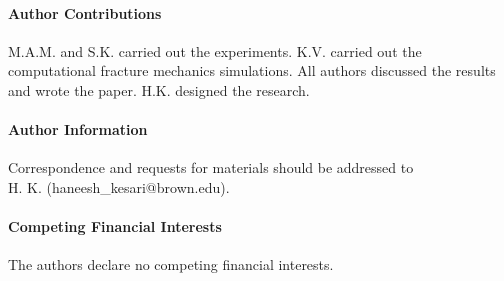 \documentclass[12pt,onecolumn]{article}
\begin{document}
\begin{bibunit}

\paragraph{Author Contributions} M.A.M. and S.K. carried out the experiments.  K.V. carried out the computational fracture mechanics simulations. All authors discussed the results and wrote the paper. H.K. designed the research.

\paragraph{Author Information} Correspondence and requests for materials should be addressed to \\ H. K. (haneesh\_kesari@brown.edu).

\paragraph{Competing Financial Interests} The authors declare no competing financial interests.

\putbib[refs]
% 


\end{bibunit}





\end{document}
